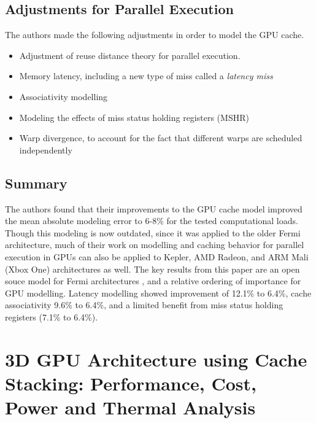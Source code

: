 \documentclass[conference]{IEEEtran}
\begin{document}
\subsection{Adjustments for Parallel Execution}
The authors made the following adjustments in order to model the GPU cache.
\begin{itemize}
    \item Adjustment of reuse distance theory for parallel execution.
    \item Memory latency, including a new type of miss called a 
        \emph{latency miss}
    \item Associativity modelling
    \item Modeling the effects of miss status holding registers (MSHR)
    \item Warp divergence, to account for the fact that different warps are 
        scheduled independently
\end{itemize}

\subsection{Summary}
The authors found that their improvements to the GPU cache model improved the
mean absolute modeling error to 6-8\% for the tested computational loads. 
Though this modeling is now outdated, since it was applied to the older Fermi
architecture, much of their work on modelling and caching behavior for
parallel execution in GPUs can also be applied to Kepler, AMD Radeon, 
and ARM Mali (Xbox One) architectures as well. The key results from this paper
are an open souce model for Fermi architectures \cite{gpumodel},
and a relative ordering of importance for GPU modelling. Latency modelling
showed improvement of 12.1\% to 6.4\%, cache associativity 9.6\% to 6.4\%,
and a limited benefit from miss status holding registers (7.1\% to 6.4\%).

\section{3D GPU Architecture using Cache Stacking: Performance, Cost, Power and
Thermal Analysis}
\end{document}
